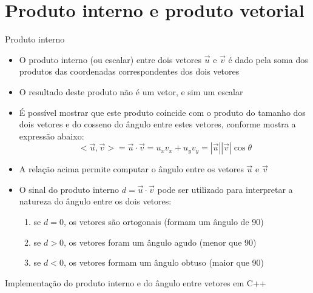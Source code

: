 \section{Produto interno e produto vetorial}

\begin{frame}[fragile]{Produto interno}

    \begin{itemize}
        \item O produto interno (ou escalar) entre dois vetores $\vec{u}$ e $\vec{v}$ é dado pela 
        soma dos produtos das coordenadas correspondentes dos dois vetores

        \item O resultado deste produto não é um vetor, e sim um escalar

        \item É possível mostrar que este produto coincide com o produto do tamanho dos dois 
            vetores e do cosseno do ângulo entre estes vetores, conforme mostra a expressão abaixo:
        \[
            <\vec{u}, \vec{v}> = \vec{u} \cdot \vec{v} = u_xv_x + u_yv_y = |\vec{u}||\vec{v}|\cos \theta
        \]

        \item A relação acima permite computar o ângulo entre os vetores $\vec{u}$ e $\vec{v}$

        \item O sinal do produto interno $d = \vec{u}\cdot\vec{v}$ pode ser utilizado para interpretar a natureza do ângulo entre os dois vetores:

        \begin{enumerate}
            \item se $d = 0$, os vetores são ortogonais (formam um ângulo de 90\textdegree)
            \item se $d > 0$, os vetores foram um ângulo agudo (menor que 90\textdegree)
            \item se $d < 0$, os vetores formam um ângulo obtuso (maior que 90\textdegree)
        \end{enumerate}
    \end{itemize}

\end{frame}

\begin{frame}[fragile]{Implementação do produto interno e do ângulo entre vetores em C++}


\end{frame}

